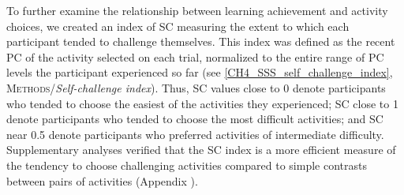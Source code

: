 To further examine the relationship between learning achievement and activity choices, we created an index of \acf{SC} measuring the extent to which each participant tended to challenge themselves. This index was defined as the recent \ac{PC} of the activity selected on each trial, normalized to the entire range of \ac{PC} levels the participant experienced so far (see \cref{CH4_SSS_self_challenge_index}, \textsc{Methods}/\textit{Self-challenge index}). Thus, \ac{SC} values close to 0 denote participants who tended to choose the easiest of the activities they experienced; \ac{SC} close to 1 denote participants who tended to choose the most difficult activities; and \ac{SC} near 0.5 denote participants who preferred activities of intermediate difficulty. Supplementary analyses verified that the \ac{SC} index is a more efficient measure of the tendency to choose challenging activities compared to simple contrasts between pairs of activities (Appendix ).

